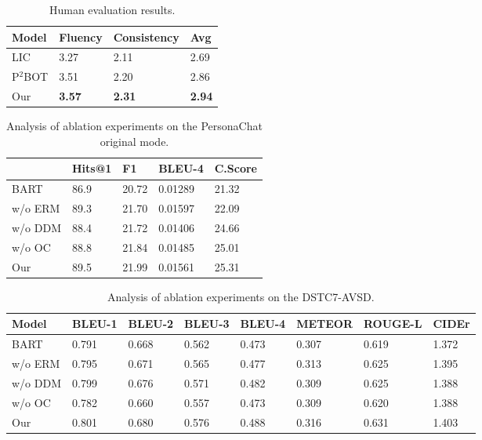 \documentclass[letterpaper]{article} \usepackage{aaai23}  \usepackage{times}  \usepackage{helvet}  \usepackage{courier}  \usepackage[hyphens]{url}  \usepackage{graphicx} \urlstyle{rm} \def\UrlFont{\rm}  \usepackage{natbib}  \usepackage{caption} \frenchspacing  \setlength{\pdfpagewidth}{8.5in}  \setlength{\pdfpageheight}{11in}  \usepackage{algorithm}
\begin{document}
\begin{table}[t]
  \centering
    \begin{tabular}{llll}
    \toprule
    Model & \multicolumn{1}{p{4.19em}}{Fluency} & \multicolumn{1}{p{4.19em}}{Consistency} & \multicolumn{1}{p{4.19em}}{Avg} \\
    \midrule
    LIC   &  3.27  &  2.11 & 2.69 \\
P$^2$BOT &  3.51  &  2.20 &  2.86\\
Our   &  \textbf{3.57} &   \textbf{2.31} &  \textbf{2.94}\\
    \bottomrule
    \end{tabular}\caption{Human evaluation results.}
\label{table5}\end{table}\begin{table}[t]
  \centering
    \begin{tabular}{lllll}
    \toprule
    \multicolumn{1}{l}{} & \multicolumn{1}{l}{Hits@1} & \multicolumn{1}{l}{F1} & \multicolumn{1}{l}{BLEU-4} & \multicolumn{1}{l}{C.Score} \\
    \midrule
    BART  & 86.9  & 20.72 & 0.01289 &  21.32\\
w/o ERM & 89.3  & 21.70  & 0.01597 & 22.09 \\
w/o DDM & 88.4  & 21.72 & 0.01406 &  24.66\\
w/o OC & 88.8  & 21.84 & 0.01485 &  25.01\\
Our   & 89.5  & 21.99 & 0.01561 &  25.31\\
    \bottomrule
    \end{tabular}\caption{Analysis of ablation experiments on the PersonaChat original mode.}
\label{table6}\end{table}\begin{table*}[t]
  \centering
    \begin{tabular}{llllllll}
    \toprule
    Model & \multicolumn{1}{p{4.19em}}{BLEU-1} & \multicolumn{1}{p{4.19em}}{BLEU-2} & \multicolumn{1}{p{4.19em}}{BLEU-3} & \multicolumn{1}{p{4.19em}}{BLEU-4} & \multicolumn{1}{p{4.19em}}{METEOR} & \multicolumn{1}{p{4.49em}}{ROUGE-L} & \multicolumn{1}{p{4.19em}}{CIDEr} \\
    \midrule
    BART  &  0.791 &  0.668 &  0.562 & 0.473  & 0.307  & 0.619  & 1.372 \\
w/o ERM & 0.795  & 0.671  & 0.565  & 0.477  &  0.313 & 0.625  & 1.395 \\
w/o DDM & 0.799  &  0.676 & 0.571  & 0.482  &  0.309 &  0.625 & 1.388 \\
w/o OC & 0.782 & 0.660 & 0.557 & 0.473 & 0.309 & 0.620 & 1.388 \\
Our   & 0.801 & 0.680  & 0.576 & 0.488 & 0.316 & 0.631 & 1.403 \\
    \bottomrule
    \end{tabular}
\caption{Analysis of ablation experiments on the DSTC7-AVSD.}   
\label{table7}
\end{table*}
\end{document}

